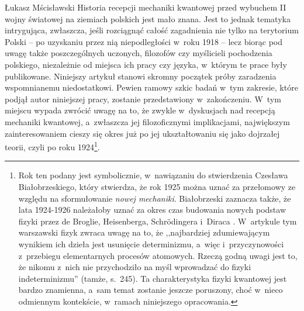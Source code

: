 \begin{artplenv}{Łukasz Mścisławski}
Historia recepcji mechaniki kwantowej przed wybuchem II wojny światowej na ziemiach polskich jest mało znana. Jest to jednak tematyka intrygująca, zwłaszcza, jeśli rozciągnąć całość zagadnienia nie tylko na terytorium Polski -- po uzyskaniu przez nią niepodległości w~roku 1918 -- lecz biorąc pod uwagę także poszczególnych uczonych, filozofów czy myślicieli pochodzenia polskiego, niezależnie od miejsca ich pracy czy języka, w~którym te prace były publikowane. Niniejszy artykuł stanowi skromny początek próby zaradzenia wspomnianemu niedostatkowi. Pewien ramowy szkic badań w~tym zakresie, które podjął autor niniejszej pracy, zostanie przedstawiony w~zakończeniu. W~tym miejscu wypada zwrócić uwagę na to, że zwykle w~dyskusjach nad recepcją mechaniki kwantowej, a~zwłaszcza jej filozoficznymi implikacjami, największym zainteresowaniem cieszy się okres już po jej ukształtowaniu się jako dojrzałej teorii, czyli po roku 1924\footnote{Rok ten podany jest symbolicznie, w~nawiązaniu do stwierdzenia Czesława Białobrzeskiego, który stwierdza, że rok 1925 można uznać za przełomowy ze względu na sformułowanie \textit{nowej mechaniki}. Białobrzeski zaznacza także, że lata 1924-1926 należałoby uznać za okres czas budowania nowych podstaw fizyki przez de Broglie, Heisenberga, Schrödingera i~Diraca
\parencite[por.][s.~244–245]{bialobrzeski_ogolnonaukowe_1937}. %
 W~artykule tym warszawski fizyk zwraca uwagę na to, że ,,najbardziej zdumiewającym wynikiem ich dzieła jest usunięcie determinizmu, a~więc i~przyczynowości z~przebiegu elementarnych procesów atomowych. Rzeczą godną uwagi jest to, że nikomu z~nich nie przychodziło na myśl wprowadzać do fizyki indeterminizmu'' (tamże, s.~245). Ta charakterystyka fizyki kwantowej jest bardzo znamienna, a~sam temat zostanie jeszcze poruszony, choć w~nieco odmiennym kontekście, w~ramach niniejszego opracowania.}.


\end{artplenv}
